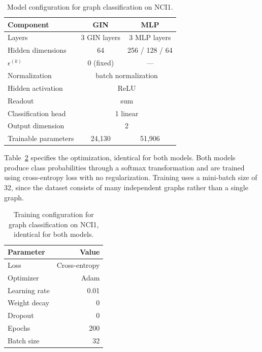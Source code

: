 \begin{table}
  \caption[Model configuration, graph classification.]{%
    Model configuration for graph classification on NCI1.
  }
  \label{tab:gin-model}
  \begin{center}
    \small
    \begin{tabular}{lcc}
      \toprule
      Component            & GIN               & MLP \\
      \midrule
      Layers                    & 3 GIN layers & 3 MLP layers \\
      Hidden dimensions     & 64                & 256 / 128 / 64 \\
      $\epsilon^{(k)}$     & 0 (fixed)         & --- \\
      Normalization        & \multicolumn{2}{c}{batch normalization} \\
      Hidden activation      & \multicolumn{2}{c}{ReLU} \\
      Readout              & \multicolumn{2}{c}{sum} \\
      Classification head  & \multicolumn{2}{c}{1 linear} \\
      Output dimension   & \multicolumn{2}{c}{2} \\
      Trainable parameters & 24{,}130          & 51{,}906 \\
      \bottomrule
    \end{tabular}
  \end{center}
\end{table}

Table~\ref{tab:gin-training} specifies the optimization,
identical for both models. Both models produce class probabilities
through a softmax transformation and are trained using cross-entropy loss
with no regularization. Training uses a mini-batch size of 32, since the dataset
consists of many independent graphs rather than a single graph.

\begin{table}
  \caption[Training configuration, graph classification.]{%
    Training configuration for graph classification on NCI1, identical for
    both models.
  }
  \label{tab:gin-training}
  \begin{center}
    \small
    \begin{tabular}{lr}
      \toprule
      Parameter     & Value \\
      \midrule
      Loss             & Cross-entropy \\
      Optimizer     & Adam \\
      Learning rate & 0.01 \\
      Weight decay  & 0 \\
      Dropout       & 0 \\
      Epochs        & 200 \\
      Batch size    & 32 \\
      \bottomrule
    \end{tabular}
  \end{center}
\end{table}

